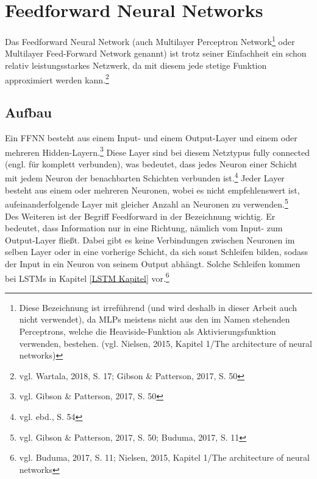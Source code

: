 \documentclass[
	a4paper,
	12pt,
	ngerman,
	oneside
]{scrreprt}											%
\newcommand{\practitioner}[1]{vgl. Gibson \& Patterson, 2017, S. {#1}}
\newcommand{\fundamentals}[1]{vgl. Buduma, 2017, S. {#1}}
\newcommand{\ebd}[1]{vgl. ebd., S. {#1}}
\begin{document}
	\chapter{Feedforward Neural Networks}\label{FFNN Kapitel}
		Das Feedforward Neural Network (auch Multilayer Perceptron Network\footnote{Diese Bezeichnung ist irreführend (und wird deshalb in dieser Arbeit auch nicht verwendet), da MLPs meistens nicht aus den im Namen stehenden Perceptrons, welche die Heaviside-Funktion als Aktivierungsfunktion verwenden, bestehen. (vgl. Nielsen, 2015, Kapitel 1/The architecture of neural networks)} oder Multilayer Feed-Forward Network genannt) ist trotz seiner Einfachheit ein schon relativ leistungsstarkes Netzwerk, da mit diesem jede stetige Funktion approximiert werden kann.\footnote{vgl. Wartala, 2018, S. 17; Gibson \& Patterson, 2017, S. 50}

		\section{Aufbau}
			Ein FFNN besteht aus einem Input- und einem Output-Layer und einem oder mehreren Hidden-Layern.\footnote{\practitioner{50}} Diese Layer sind bei diesem Netztypus fully connected (engl. für komplett verbunden), was bedeutet, dass jedes Neuron einer Schicht mit jedem Neuron der benachbarten Schichten verbunden ist.\footnote{\ebd{54}} Jeder Layer besteht aus einem oder mehreren Neuronen, wobei es nicht empfehlenswert ist, aufeinanderfolgende Layer mit gleicher Anzahl an Neuronen zu verwenden.\footnote{vgl. Gibson \& Patterson, 2017, S. 50; Buduma, 2017, S. 11} \\
			
	
			Des Weiteren ist der Begriff Feedforward in der Bezeichnung wichtig. Er bedeutet, dass Information nur in eine Richtung, nämlich vom Input- zum Output-Layer fließt. Dabei gibt es keine Verbindungen zwischen Neuronen im selben Layer oder in eine vorherige Schicht, da sich sonst Schleifen bilden, sodass der Input in ein Neuron von seinem Output abhängt. Solche Schleifen kommen bei LSTMs in Kapitel \ref{LSTM Kapitel} vor.\footnote{vgl. Buduma, 2017, S. 11; Nielsen, 2015, Kapitel 1/The architecture of neural networks}
	
\end{document}
